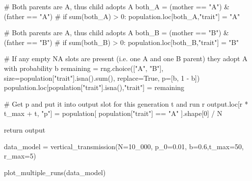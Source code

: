 \documentclass[
  a4paperpaper,
  ,captions=tableheading
]{scrbook}
\newenvironment{Shaded}{\begin{snugshade}}{\end{snugshade}}
\newcommand{\BuiltInTok}[1]{\textcolor[rgb]{0.00,0.23,0.31}{#1}}
\newcommand{\CommentTok}[1]{\textcolor[rgb]{0.37,0.37,0.37}{#1}}
\newcommand{\ControlFlowTok}[1]{\textcolor[rgb]{0.00,0.23,0.31}{#1}}
\newcommand{\DecValTok}[1]{\textcolor[rgb]{0.68,0.00,0.00}{#1}}
\newcommand{\FloatTok}[1]{\textcolor[rgb]{0.68,0.00,0.00}{#1}}
\newcommand{\NormalTok}[1]{\textcolor[rgb]{0.00,0.23,0.31}{#1}}
\newcommand{\OperatorTok}[1]{\textcolor[rgb]{0.37,0.37,0.37}{#1}}
\newcommand{\StringTok}[1]{\textcolor[rgb]{0.13,0.47,0.30}{#1}}
\newcommand{\VariableTok}[1]{\textcolor[rgb]{0.07,0.07,0.07}{#1}}
\begin{document}
\begin{Shaded}
\begin{Highlighting}[]
            \CommentTok{\# Both parents are A, thus child adopts A}
\NormalTok{            both\_A }\OperatorTok{=}\NormalTok{ (mother }\OperatorTok{==} \StringTok{"A"}\NormalTok{) }\OperatorTok{\&}\NormalTok{ (father }\OperatorTok{==} \StringTok{"A"}\NormalTok{)}
            \CommentTok{\# if sum(both\_A) \textgreater{} 0:}
\NormalTok{            population.loc[both\_A,}\StringTok{"trait"}\NormalTok{] }\OperatorTok{=} \StringTok{"A"}

            \CommentTok{\# Both parents are A, thus child adopts A}
\NormalTok{            both\_B }\OperatorTok{=}\NormalTok{ (mother }\OperatorTok{==} \StringTok{"B"}\NormalTok{) }\OperatorTok{\&}\NormalTok{ (father }\OperatorTok{==} \StringTok{"B"}\NormalTok{)}
            \CommentTok{\# if sum(both\_B) \textgreater{} 0:}
\NormalTok{            population.loc[both\_B,}\StringTok{"trait"}\NormalTok{] }\OperatorTok{=} \StringTok{"B"}

            \CommentTok{\# If any empty NA slots are present (i.e. one A and one B parent) they adopt A with probability b}
\NormalTok{            remaining }\OperatorTok{=}\NormalTok{ rng.choice([}\StringTok{"A"}\NormalTok{, }\StringTok{"B"}\NormalTok{], size}\OperatorTok{=}\NormalTok{population[}\StringTok{"trait"}\NormalTok{].isna().}\BuiltInTok{sum}\NormalTok{(), replace}\OperatorTok{=}\VariableTok{True}\NormalTok{, p}\OperatorTok{=}\NormalTok{[b, }\DecValTok{1} \OperatorTok{{-}}\NormalTok{ b])}
\NormalTok{            population.loc[population[}\StringTok{"trait"}\NormalTok{].isna(),}\StringTok{"trait"}\NormalTok{] }\OperatorTok{=}\NormalTok{ remaining}
            
            \CommentTok{\# Get p and put it into output slot for this generation t and run r}
\NormalTok{            output.loc[r }\OperatorTok{*}\NormalTok{ t\_max }\OperatorTok{+}\NormalTok{ t, }\StringTok{"p"}\NormalTok{] }\OperatorTok{=}\NormalTok{ population[ population[}\StringTok{"trait"}\NormalTok{] }\OperatorTok{==} \StringTok{"A"}\NormalTok{ ].shape[}\DecValTok{0}\NormalTok{] }\OperatorTok{/}\NormalTok{ N}

    \ControlFlowTok{return}\NormalTok{ output }
\end{Highlighting}
\end{Shaded}

\begin{Shaded}
\begin{Highlighting}[]
\NormalTok{data\_model }\OperatorTok{=}\NormalTok{ vertical\_transmission(N}\OperatorTok{=}\DecValTok{10\_000}\NormalTok{, p\_0}\OperatorTok{=}\FloatTok{0.01}\NormalTok{, b}\OperatorTok{=}\FloatTok{0.6}\NormalTok{,t\_max}\OperatorTok{=}\DecValTok{50}\NormalTok{, r\_max}\OperatorTok{=}\DecValTok{5}\NormalTok{)}

\NormalTok{plot\_multiple\_runs(data\_model)}
\end{Highlighting}
\end{Shaded}
\end{document}
